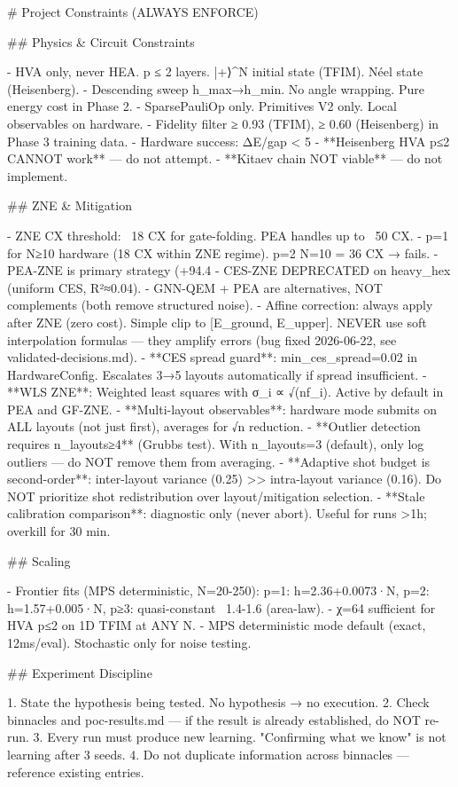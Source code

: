 # Project Constraints (ALWAYS ENFORCE)

## Physics & Circuit Constraints

- HVA only, never HEA. p ≤ 2 layers. |+⟩^N initial state (TFIM). Néel state (Heisenberg).
- Descending sweep h_max→h_min. No angle wrapping. Pure energy cost in Phase 2.
- SparsePauliOp only. Primitives V2 only. Local observables on hardware.
- Fidelity filter ≥ 0.93 (TFIM), ≥ 0.60 (Heisenberg) in Phase 3 training data.
- Hardware success: ΔE/gap < 5%
- **Heisenberg HVA p≤2 CANNOT work** — do not attempt.
- **Kitaev chain NOT viable** — do not implement.

## ZNE & Mitigation

- ZNE CX threshold: ~18 CX for gate-folding. PEA handles up to ~50 CX.
- p=1 for N≥10 hardware (18 CX within ZNE regime). p=2 N=10 = 36 CX → fails.
- PEA-ZNE is primary strategy (+94.4%
- CES-ZNE DEPRECATED on heavy_hex (uniform CES, R²≈0.04).
- GNN-QEM + PEA are alternatives, NOT complements (both remove structured noise).
- Affine correction: always apply after ZNE (zero cost). Simple clip to [E_ground, E_upper]. NEVER use soft interpolation formulas — they amplify errors (bug fixed 2026-06-22, see validated-decisions.md).
- **CES spread guard**: min_ces_spread=0.02 in HardwareConfig. Escalates 3→5 layouts automatically if spread insufficient.
- **WLS ZNE**: Weighted least squares with σ_i ∝ √(nf_i). Active by default in PEA and GF-ZNE.
- **Multi-layout observables**: hardware mode submits on ALL layouts (not just first), averages for √n reduction.
- **Outlier detection requires n_layouts≥4** (Grubbs test). With n_layouts=3 (default), only log outliers — do NOT remove them from averaging.
- **Adaptive shot budget is second-order**: inter-layout variance (0.25) >> intra-layout variance (0.16). Do NOT prioritize shot redistribution over layout/mitigation selection.
- **Stale calibration comparison**: diagnostic only (never abort). Useful for runs >1h; overkill for 30 min.

## Scaling

- Frontier fits (MPS deterministic, N=20-250): p=1: h=2.36+0.0073·N, p=2: h=1.57+0.005·N, p≥3: quasi-constant ~1.4-1.6 (area-law).
- χ=64 sufficient for HVA p≤2 on 1D TFIM at ANY N.
- MPS deterministic mode default (exact, 12ms/eval). Stochastic only for noise testing.

## Experiment Discipline

1. State the hypothesis being tested. No hypothesis → no execution.
2. Check binnacles and poc-results.md — if the result is already established, do NOT re-run.
3. Every run must produce new learning. "Confirming what we know" is not learning after 3 seeds.
4. Do not duplicate information across binnacles — reference existing entries.

